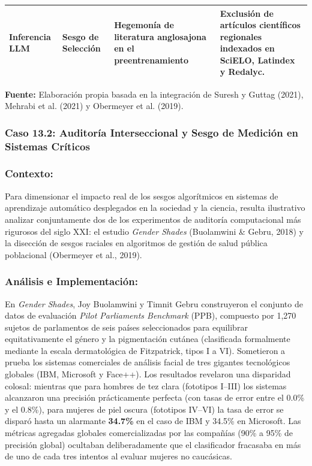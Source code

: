 \begin{table}[htpb!]
\begin{tcolorbox}[colback=white, colframe=unmsm_gold, arc=3pt, boxrule=0.8pt, top=0.2cm, bottom=0.2cm, left=0.3cm, right=0.3cm]
\begin{tabularx}{\textwidth}{l p{3.2cm} p{4.2cm} X}
Inferencia LLM & Sesgo de Selección & Hegemonía de literatura anglosajona en el preentrenamiento & Exclusión de artículos científicos regionales indexados en SciELO, Latindex y Redalyc. \\
\bottomrule
\end{tabularx}
\vspace{0.15cm}
\raggedright
\scriptsize \textbf{Fuente:} Elaboración propia basada en la integración de Suresh y Guttag (2021), Mehrabi et al. (2021) y Obermeyer et al. (2019).
\end{tcolorbox}
\vspace{-0.2cm}
\end{table}

\subsubsection{Caso 13.2: Auditoría Interseccional y Sesgo de Medición en Sistemas Críticos}

\subsubsection*{Contexto:}
Para dimensionar el impacto real de los sesgos algorítmicos en sistemas de aprendizaje automático desplegados en la sociedad y la ciencia, resulta ilustrativo analizar conjuntamente dos de los experimentos de auditoría computacional más rigurosos del siglo XXI: el estudio \textit{Gender Shades} (Buolamwini \& Gebru, 2018) y la disección de sesgos raciales en algoritmos de gestión de salud pública poblacional (Obermeyer et al., 2019).

\subsubsection*{Análisis e Implementación:}
En \textit{Gender Shades}, Joy Buolamwini y Timnit Gebru construyeron el conjunto de datos de evaluación \textit{Pilot Parliaments Benchmark} (PPB), compuesto por 1,270 sujetos de parlamentos de seis países seleccionados para equilibrar equitativamente el género y la pigmentación cutánea (clasificada formalmente mediante la escala dermatológica de Fitzpatrick, tipos I a VI). Sometieron a prueba los sistemas comerciales de análisis facial de tres gigantes tecnológicos globales (IBM, Microsoft y Face++). Los resultados revelaron una disparidad colosal: mientras que para hombres de tez clara (fototipos I--III) los sistemas alcanzaron una precisión prácticamente perfecta (con tasas de error entre el 0.0\% y el 0.8\%), para mujeres de piel oscura (fototipos IV--VI) la tasa de error se disparó hasta un alarmante \textbf{34.7\%} en el caso de IBM y 34.5\% en Microsoft. Las métricas agregadas globales comercializadas por las compañías (90\% a 95\% de precisión global) ocultaban deliberadamente que el clasificador fracasaba en más de uno de cada tres intentos al evaluar mujeres no caucásicas.

